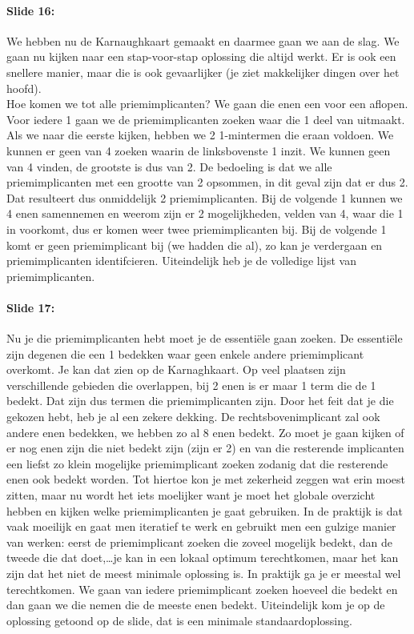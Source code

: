 \documentclass[10pt,a4paper]{book}
\begin{document}
\paragraph{Slide 16:} We hebben nu de Karnaughkaart gemaakt en daarmee gaan we aan de slag. We gaan nu kijken naar een stap-voor-stap oplossing die altijd werkt. Er is ook een snellere manier, maar die is ook gevaarlijker (je ziet makkelijker dingen over het hoofd).\\
Hoe komen we tot alle priemimplicanten? We gaan die enen een voor een aflopen. Voor iedere 1 gaan we de priemimplicanten zoeken waar die 1 deel van uitmaakt. Als we naar die eerste kijken, hebben we 2 1-mintermen die eraan voldoen. We kunnen er geen van 4 zoeken waarin de linksbovenste 1 inzit. We kunnen geen van 4 vinden, de grootste is dus van 2. De bedoeling is dat we alle priemimplicanten met een grootte van 2 opsommen, in dit geval zijn dat er dus 2. Dat resulteert dus onmiddelijk 2 priemimplicanten. Bij de volgende 1 kunnen we 4 enen samennemen en weerom zijn er 2 mogelijkheden, velden van 4, waar die 1 in voorkomt, dus er komen weer twee priemimplicanten bij. Bij de volgende 1 komt er geen priemimplicant bij (we hadden die al), zo kan je verdergaan en priemimplicanten identifcieren. Uiteindelijk heb je de volledige lijst van priemimplicanten. 

\paragraph{Slide 17:} Nu je die priemimplicanten hebt moet je de essenti\"ele gaan zoeken. De essenti\"ele zijn degenen die een 1 bedekken waar geen enkele andere priemimplicant overkomt. Je kan dat zien op de Karnaghkaart. Op veel plaatsen zijn verschillende gebieden die overlappen, bij 2 enen is er maar 1 term die de 1 bedekt. Dat zijn dus termen die priemimplicanten zijn. Door het feit dat je die gekozen hebt, heb je al een zekere dekking. De rechtsbovenimplicant zal ook andere enen bedekken, we hebben zo al 8 enen bedekt. Zo moet je gaan kijken of er nog enen zijn die niet bedekt zijn (zijn er 2) en van die resterende implicanten een liefst zo klein mogelijke priemimplicant zoeken zodanig dat die resterende enen ook bedekt worden. Tot hiertoe kon je met zekerheid zeggen wat erin moest zitten, maar nu wordt het iets moelijker want je moet het globale overzicht hebben en kijken welke priemimplicanten je gaat gebruiken. In de praktijk is dat vaak moeilijk en gaat men iteratief te werk en gebruikt men een gulzige manier van werken: eerst de priemimplicant zoeken die zoveel mogelijk bedekt, dan de tweede die dat doet,\ldots je kan in een lokaal optimum terechtkomen, maar het kan zijn dat het niet de meest minimale oplossing is. In praktijk ga je er meestal wel terechtkomen. We gaan van iedere priemimplicant zoeken hoeveel die bedekt en dan gaan we die nemen die de meeste enen bedekt. Uiteindelijk kom je op de oplossing getoond op de slide, dat is een minimale standaardoplossing.
\end{document}
